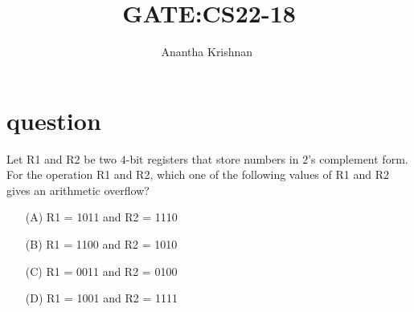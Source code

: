 \documentclass[journal,12pt,onecolumn]{IEEEtran}
\theoremstyle{remark}
\begin{document}

\vspace{3cm}

\title{GATE:CS22-18}
\author{Anantha Krishnan $^{}$%
}
\maketitle
\bigskip



\section{question}
Let R1 and R2 be two $4$-bit registers that store numbers in $2$'s complement form. For the operation R1 and R2, which one of the following values of R1 and R2 gives an arithmetic overflow?
\begin{enumerate}
    \item [(A)] R1 = 1011 and R2 = 1110
        \item [(B)] R1 = 1100 and R2 = 1010
    \item [(C)] R1 = 0011 and R2 = 0100
    \item [(D)] R1 = 1001 and R2 = 1111
\end{enumerate}
 
\end{document}
